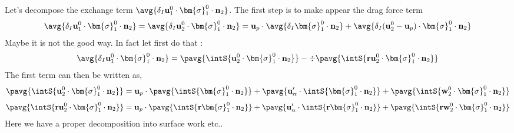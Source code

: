 Let's decompose the exchange term $\avg{\delta_I \textbf{u}^0_1 \cdot \bm{\sigma}_1^0 \cdot \textbf{n}_2}$.
The first step is to make appear the drag force term 
\begin{align*}
    \avg{\delta_I \textbf{u}^0_1 \cdot \bm{\sigma}_1^0 \cdot \textbf{n}_2}
    = 
    \avg{\delta_I \textbf{u}^0_2 \cdot \bm{\sigma}_1^0 \cdot \textbf{n}_2}
    =
    \textbf{u}_p \cdot  \avg{\delta_I \bm{\sigma}_1^0 \cdot \textbf{n}_2}
    + \avg{\delta_I (\textbf{u}^0_2 - \textbf{u}_p) \cdot \bm{\sigma}_1^0 \cdot \textbf{n}_2}
\end{align*}
Maybe it is not the good way. In fact let first do that : 
\begin{align*}
    \avg{\delta_I \textbf{u}^0_1 \cdot \bm{\sigma}_1^0 \cdot \textbf{n}_2}
    =
    \pavg{ \intS{\textbf{u}^0_2 \cdot \bm{\sigma}_1^0 \cdot \textbf{n}_2}}
    - \div\pavg{ \intS{\textbf{r}\textbf{u}^0_2 \cdot \bm{\sigma}_1^0 \cdot \textbf{n}_2}}
\end{align*}
The first term can then be written as, 
\begin{align*}
    \pavg{ \intS{\textbf{u}^0_2 \cdot \bm{\sigma}_1^0 \cdot \textbf{n}_2}}
    = 
    \textbf{u}_p \cdot \pavg{\intS{\bm{\sigma}_1^0 \cdot \textbf{n}_2}}
    + \pavg{ \textbf{u}_\alpha' \cdot \intS{  \bm{\sigma}_1^0 \cdot \textbf{n}_2}}
    + \pavg{ \intS{\textbf{w}_2^0 \cdot \bm{\sigma}_1^0 \cdot \textbf{n}_2}}
\end{align*}
\begin{align*}
    \pavg{ \intS{\textbf{r}\textbf{u}^0_2 \cdot \bm{\sigma}_1^0 \cdot \textbf{n}_2}}
    = 
    \textbf{u}_p \cdot \pavg{\intS{ \textbf{r}\bm{\sigma}_1^0 \cdot \textbf{n}_2}}
    + \pavg{ \textbf{u}_\alpha' \cdot \intS{ \textbf{r} \bm{\sigma}_1^0 \cdot \textbf{n}_2}}
    + \pavg{ \intS{\textbf{r}\textbf{w}_2^0 \cdot \bm{\sigma}_1^0 \cdot \textbf{n}_2}}
\end{align*}
Here we have a proper decomposition into surface work etc.. 


